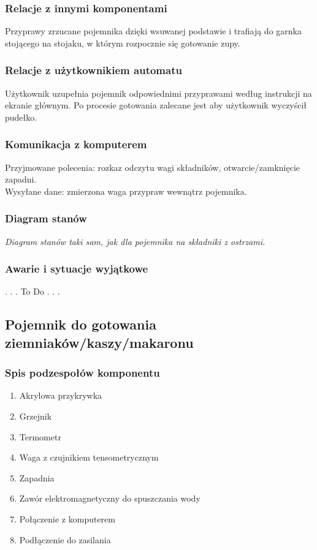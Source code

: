 \documentclass[12pt,a4paper,notitlepage]{report}
\begin{document}
\subsubsection{Relacje z innymi komponentami}
Przyprawy zrzucane pojemnika dzięki wsuwanej podstawie i trafiają do garnka stojącego na stojaku, w którym rozpocznie się gotowanie zupy.

\subsubsection{Relacje z użytkownikiem automatu}
Użytkownik uzupełnia pojemnik odpowiednimi przyprawami według instrukcji na ekranie głównym. Po procesie gotowania zalecane jest aby użytkownik wyczyścił pudełko.

\subsubsection{Komunikacja z komputerem}
Przyjmowane polecenia: rozkaz odczytu wagi składników, otwarcie/zamknięcie zapadni.\\
Wysyłane dane: zmierzona waga przypraw wewnątrz pojemnika.

\subsubsection{Diagram stanów}
\emph{Diagram stanów taki sam, jak dla pojemnika na składniki z ostrzami.}

\subsubsection{Awarie i sytuacje wyjątkowe}
. . . To Do . . .



\subsection{Pojemnik do gotowania ziemniaków/kaszy/makaronu}
\subsubsection{Spis podzespołów komponentu}
\begin{enumerate}
  \item Akrylowa przykrywka
  \item Grzejnik
  \item Termometr
  \item Waga z czujnikiem tensometrycznym
  \item Zapadnia
  \item Zawór elektromagnetyczny do spuszczania wody
  \item Połączenie z komputerem
  \item Podłączenie do zasilania
\end{enumerate}
\end{document}
